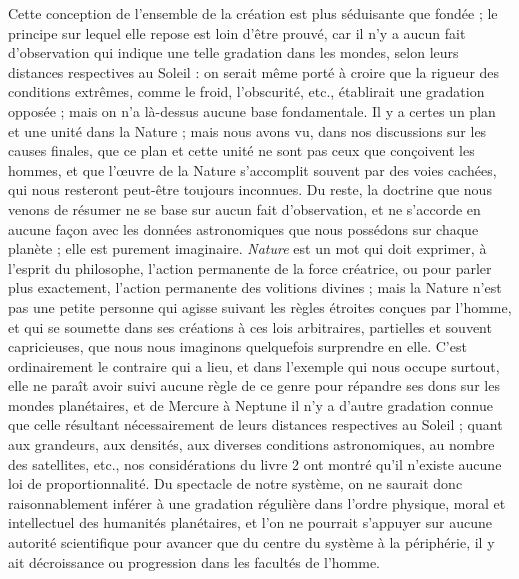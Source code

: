 \documentclass[a4paper, 11pt, oneside, landscape]{article}
\begin{document}
Cette conception de l'ensemble de la création est plus séduisante que fondée ; le principe sur lequel elle repose est loin d'être prouvé, car il n'y a aucun fait d'observation qui indique une telle gradation dans les mondes, selon leurs distances respectives au Soleil : on serait même porté à croire que la rigueur des conditions extrêmes, comme le froid, l'obscurité, etc., établirait une gradation opposée ; mais on n'a là-dessus aucune base fondamentale. Il y a certes un plan et une unité dans la Nature ; mais nous avons vu, dans nos discussions sur les causes finales, que ce plan et cette unité ne sont pas ceux que conçoivent les hommes, et que l'œuvre de la Nature s'accomplit souvent par des voies cachées, qui nous resteront peut-être toujours inconnues. Du reste, la doctrine que nous venons de résumer ne se base sur aucun fait d'observation, et ne s'accorde en aucune façon avec les données astronomiques que nous possédons sur chaque planète ; elle est purement imaginaire. \emph{Nature} est un mot qui doit exprimer, à l'esprit du philosophe, l'action permanente de la force créatrice, ou pour parler plus exactement, l'action permanente des volitions divines ; mais la Nature n'est pas une petite personne qui agisse suivant les règles étroites conçues par l'homme, et qui se soumette dans ses créations à ces lois arbitraires, partielles et souvent capricieuses, que nous nous imaginons quelquefois surprendre en elle. C'est ordinairement le contraire qui a lieu, et dans l'exemple qui nous occupe surtout, elle ne paraît avoir suivi aucune règle de ce genre pour répandre ses dons sur les mondes planétaires, et de Mercure à Neptune il n'y a d'autre gradation connue que celle résultant nécessairement de leurs distances respectives au Soleil ; quant aux grandeurs, aux densités, aux diverses conditions astronomiques, au nombre des satellites, etc., nos considérations du livre 2 ont montré qu'il n'existe aucune loi de proportionnalité. Du spectacle de notre système, on ne saurait donc raisonnablement inférer à une gradation régulière dans l'ordre physique, moral et intellectuel des humanités planétaires, et l'on ne pourrait s'appuyer sur aucune autorité scientifique pour avancer que du centre du système à la périphérie, il y ait décroissance ou progression dans les facultés de l'homme.
\end{document}
